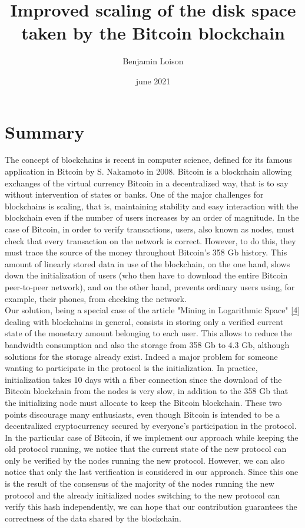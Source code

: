 \documentclass[12pt,a4paper]{article}
\newcommand{\source}[1]{\hyperlink{#1}{[#1]}}
\begin{document}
	\title{Improved scaling of the disk space taken by the Bitcoin blockchain}
	\author{Benjamin Loison}
	\date{june 2021}
	\maketitle
	
	\section{Summary}
	
	The concept of blockchains is recent in computer science, defined for its famous application in Bitcoin by S. Nakamoto in 2008. Bitcoin is a blockchain allowing exchanges of the virtual currency Bitcoin in a decentralized way, that is to say without intervention of states or banks. One of the major challenges for blockchains is scaling, that is, maintaining stability and easy interaction with the blockchain even if the number of users increases by an order of magnitude. In the case of Bitcoin, in order to verify transactions, users, also known as nodes, must check that every transaction on the network is correct. However, to do this, they must trace the source of the money throughout Bitcoin's 358 Gb history. This amount of linearly stored data in use of the blockchain, on the one hand, slows down the initialization of users (who then have to download the entire Bitcoin peer-to-peer network), and on the other hand, prevents ordinary users using, for example, their phones, from checking the network.\\
  Our solution, being a special case of the article "Mining in Logarithmic Space" \source{4} dealing with blockchains in general, consists in storing only a verified current state of the monetary amount belonging to each user. This allows to reduce the bandwidth consumption and also the storage from 358 Gb to 4.3 Gb, although solutions for the storage already exist. Indeed a major problem for someone wanting to participate in the protocol is the initialization. In practice, initialization takes 10 days with a fiber connection since the download of the Bitcoin blockchain from the nodes is very slow, in addition to the 358 Gb that the initializing node must allocate to keep the Bitcoin blockchain. These two points discourage many enthusiasts, even though Bitcoin is intended to be a decentralized cryptocurrency secured by everyone's participation in the protocol.\\ %
	In the particular case of Bitcoin, if we implement our approach while keeping the old protocol running, we notice that the current state of the new protocol can only be verified by the nodes running the new protocol. However, we can also notice that only the last verification is considered in our approach. Since this one is the result of the consensus of the majority of the nodes running the new protocol and the already initialized nodes switching to the new protocol can verify this hash independently, we can hope that our contribution guarantees the correctness of the data shared by the blockchain.\\
\end{document}
